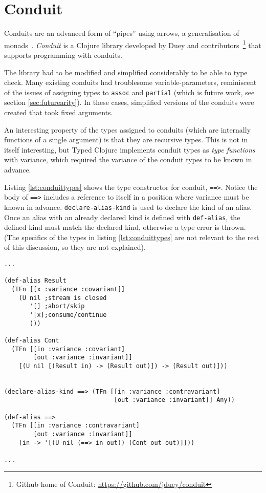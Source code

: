 \section{Conduit}

Conduits are an advanced form of ``pipes'' using arrows, a generalisation of monads~\cite{ConduitRef}.
\emph{Conduit} is a Clojure library developed by Duey and 
contributors~\footnote{Github home of Conduit: \url{https://github.com/jduey/conduit}} 
that supports programming with conduits.

The library had to be modified and simplified considerably to be able to type check.
Many existing conduits had troublesome variable-parameters, reminiscent of the
issues of assigning types to \lstinline|assoc| and \lstinline|partial|
(which is future work, see section \ref{sec:futurearity}).
In these cases, simplified versions of the conduits were created that 
took fixed arguments.

An interesting property of the types assigned to conduits (which
are internally functions of a single argument) is that they are 
recursive types. This is not in itself interesting, but Typed Clojure
implements conduit types as \emph{type functions} with variance,
which required the variance of the conduit types to be known in advance.

Listing \ref{lst:conduittypes} shows the type constructor for conduit,
\lstinline|==>|. Notice the body of \lstinline|==>| includes a reference
to itself in a position where variance must be known in advance.
\lstinline|declare-alias-kind| is used to declare the kind of an alias.
Once an alias with an already declared kind is defined with \lstinline|def-alias|,
the defined kind must match the declared kind, otherwise a type error is thrown.
(The specifics of the types in listing \ref{lst:conduittypes} are not relevant to the rest of this discussion,
so they are not explained).

\begin{lstlisting}[caption=Types for Conduits, label=lst:conduittypes]
...

(def-alias Result
  (TFn [[x :variance :covariant]]
    (U nil ;stream is closed
       '[] ;abort/skip
       '[x];consume/continue
       )))

(def-alias Cont
  (TFn [[in :variance :covariant]
        [out :variance :invariant]]
    [(U nil [(Result in) -> (Result out)]) -> (Result out)]))


(declare-alias-kind ==> (TFn [[in :variance :contravariant]
                              [out :variance :invariant]] Any))

(def-alias ==>
  (TFn [[in :variance :contravariant] 
        [out :variance :invariant]]
    [in -> '[(U nil (==> in out)) (Cont out out)]]))

...
\end{lstlisting}


